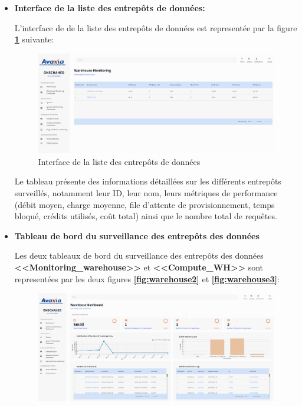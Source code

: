 \begin{itemize}
        \item \textbf{Interface de la liste des entrepôts de données:}
        \par L'interface de  de la liste des entrepôts de données est representée par la figure \textbf{\ref{fig:warehouse1}} suivante:
        \begin{figure}[H]
            \centering
            \includegraphics[width =1\linewidth]{img/captures/warehouse/liste.png}
            \caption{Interface de la liste des entrepôts de données}
                \label{fig:warehouse1}
            \end{figure}
            \par Le tableau présente des informations détaillées sur les différents entrepôts surveillés, notamment leur ID, leur nom, leurs métriques de performance (débit moyen, charge moyenne, file d'attente de provisionnement, temps bloqué, crédits utilisés, coût total) ainsi que le nombre total de requêtes. \\
            \item \textbf{Tableau de bord du surveillance des entrepôts des données}
            \par Les deux tableaux de bord du surveillance des entrepôts des données \textbf{<<Monitoring\_warehouse>>} et \textbf{<<Compute\_WH>>} sont representées par les deux figures \textbf{\ref{fig:warehouse2}} et \textbf{\ref{fig:warehouse3}}:
                \begin{figure}[H]
                    \centering
                    \includegraphics[width =1\linewidth]{img/captures/warehouse/warehouse_dash.png}

\end{figure}
\end{itemize}
